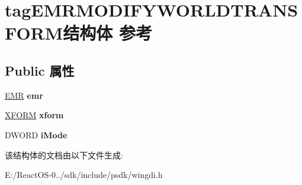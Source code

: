 \hypertarget{structtag_e_m_r_m_o_d_i_f_y_w_o_r_l_d_t_r_a_n_s_f_o_r_m}{}\section{tag\+E\+M\+R\+M\+O\+D\+I\+F\+Y\+W\+O\+R\+L\+D\+T\+R\+A\+N\+S\+F\+O\+R\+M结构体 参考}
\label{structtag_e_m_r_m_o_d_i_f_y_w_o_r_l_d_t_r_a_n_s_f_o_r_m}
\subsection*{Public 属性}
\begin{DoxyCompactItemize}
\item 
\mbox{\label{structtag_e_m_r_m_o_d_i_f_y_w_o_r_l_d_t_r_a_n_s_f_o_r_m_a765fa3388b50725bc0f17e36c51ccf36}} 
\hyperlink{structtag_e_m_r}{E\+MR} {\bfseries emr}
\item 
\mbox{\label{structtag_e_m_r_m_o_d_i_f_y_w_o_r_l_d_t_r_a_n_s_f_o_r_m_a489174757db9283aa62144c5b37c5048}} 
\hyperlink{struct___x_f_o_r_m}{X\+F\+O\+RM} {\bfseries xform}
\item 
\mbox{\label{structtag_e_m_r_m_o_d_i_f_y_w_o_r_l_d_t_r_a_n_s_f_o_r_m_a9c19fcec114cafa191b0fa601288b6a2}} 
D\+W\+O\+RD {\bfseries i\+Mode}
\end{DoxyCompactItemize}


该结构体的文档由以下文件生成\+:\begin{DoxyCompactItemize}
\item 
E\+:/\+React\+O\+S-\/0../sdk/include/psdk/wingdi.\+h\end{DoxyCompactItemize}
